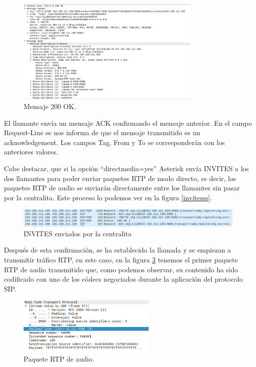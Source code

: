 \documentclass[a4paper]{article}
\begin{document}
\begin{figure}[htb]
    \begin{center}
        \includegraphics[width=0.8\textwidth]{200OK-2.png}
        \caption{Mensaje 200 OK.}
         \label{fig:200ok}
    \end{center}
\end{figure}

El llamante envía un mensaje ACK confirmando el mensaje anterior. En el campo Request-Line se nos informa de que el mensaje transmitido es un acknowledgement. Los campos Tag, From y To se corresponderán con los anteriores valores.

Cabe destacar, que si la opción ``directmedia=yes'' Asterisk envía INVITES a los dos llamantes para poder enviar paquetes RTP de modo directo, es decir, los paquetes RTP de audio se enviarán directamente entre los llamantes sin pasar por la centralita. Este proceso lo podemos ver en la figura \ref{invitesss}.

\begin{figure}[htb]
    \begin{center}
        \includegraphics[width=1\textwidth]{invitesRTP.png}
        \caption{INVITES enviados por la centralita}
         \label{fig:invitesss}
    \end{center}
\end{figure}

\newpage
Después de esta confirmación, se ha establecido la llamada y se empiezan a transmitir tráfico RTP, en este caso, en la figura \ref{fig:RTPaudio} tenemos el primer paquete RTP de audio transmitido que, como podemos observar, su contenido ha sido codificado con uno de los códecs negociados durante la aplicación del protocolo SIP.
\begin{figure}[htb]
    \begin{center}
        \includegraphics[width=0.6\textwidth]{RTP-1.png}
        \caption{Paquete RTP de audio.}
         \label{fig:RTPaudio}
    \end{center}
\end{figure}
\end{document}
